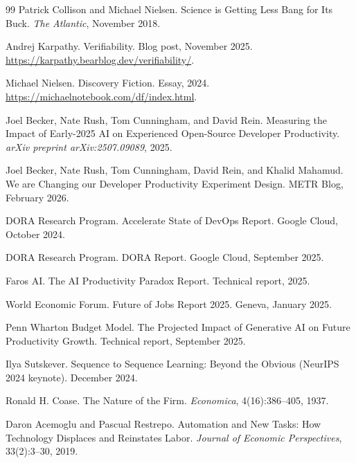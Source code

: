 \documentclass[11pt,a4paper]{article}
\begin{document}
\begin{thebibliography}{99}
Patrick Collison and Michael Nielsen.
\newblock Science is Getting Less Bang for Its Buck.
\newblock \emph{The Atlantic}, November 2018.

Andrej Karpathy.
\newblock Verifiability.
\newblock Blog post, November 2025.
\newblock \url{https://karpathy.bearblog.dev/verifiability/}.

Michael Nielsen.
\newblock Discovery Fiction.
\newblock Essay, 2024.
\newblock \url{https://michaelnotebook.com/df/index.html}.

Joel Becker, Nate Rush, Tom Cunningham, and David Rein.
\newblock Measuring the Impact of Early-2025 AI on Experienced Open-Source Developer Productivity.
\newblock \emph{arXiv preprint arXiv:2507.09089}, 2025.

Joel Becker, Nate Rush, Tom Cunningham, David Rein, and Khalid Mahamud.
\newblock We are Changing our Developer Productivity Experiment Design.
\newblock METR Blog, February 2026.

DORA Research Program.
 Accelerate State of DevOps Report.
\newblock Google Cloud, October 2024.

DORA Research Program.
 DORA Report.
\newblock Google Cloud, September 2025.

Faros AI.
\newblock The AI Productivity Paradox Report.
\newblock Technical report, 2025.

World Economic Forum.
\newblock Future of Jobs Report 2025.
\newblock Geneva, January 2025.

Penn Wharton Budget Model.
\newblock The Projected Impact of Generative AI on Future Productivity Growth.
\newblock Technical report, September 2025.

Ilya Sutskever.
\newblock Sequence to Sequence Learning: Beyond the Obvious (NeurIPS 2024 keynote).
\newblock December 2024.

Ronald H. Coase.
\newblock The Nature of the Firm.
\newblock \emph{Economica}, 4(16):386--405, 1937.

Daron Acemoglu and Pascual Restrepo.
\newblock Automation and New Tasks: How Technology Displaces and Reinstates Labor.
\newblock \emph{Journal of Economic Perspectives}, 33(2):3--30, 2019.

\end{thebibliography}
\end{document}
